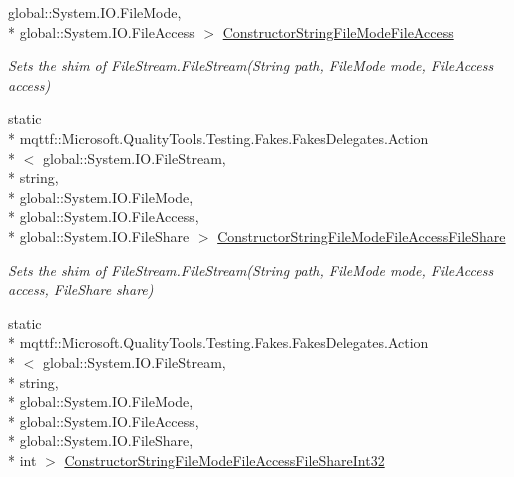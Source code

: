 \begin{DoxyCompactItemize}
global\-::\-System.\-I\-O.\-File\-Mode, \\*
global\-::\-System.\-I\-O.\-File\-Access $>$ \hyperlink{class_system_1_1_i_o_1_1_fakes_1_1_shim_file_stream_a887ebdd11f80824bc9edd71fa6af7ea5}{Constructor\-String\-File\-Mode\-File\-Access}
\begin{DoxyCompactList}\small\item\em Sets the shim of File\-Stream.\-File\-Stream(\-String path, File\-Mode mode, File\-Access access)\end{DoxyCompactList}\item 
static \\*
mqttf\-::\-Microsoft.\-Quality\-Tools.\-Testing.\-Fakes.\-Fakes\-Delegates.\-Action\\*
$<$ global\-::\-System.\-I\-O.\-File\-Stream, \\*
string, \\*
global\-::\-System.\-I\-O.\-File\-Mode, \\*
global\-::\-System.\-I\-O.\-File\-Access, \\*
global\-::\-System.\-I\-O.\-File\-Share $>$ \hyperlink{class_system_1_1_i_o_1_1_fakes_1_1_shim_file_stream_a7ddf87d61ad9926d3bb3f43d155b4c17}{Constructor\-String\-File\-Mode\-File\-Access\-File\-Share}
\begin{DoxyCompactList}\small\item\em Sets the shim of File\-Stream.\-File\-Stream(\-String path, File\-Mode mode, File\-Access access, File\-Share share)\end{DoxyCompactList}\item 
static \\*
mqttf\-::\-Microsoft.\-Quality\-Tools.\-Testing.\-Fakes.\-Fakes\-Delegates.\-Action\\*
$<$ global\-::\-System.\-I\-O.\-File\-Stream, \\*
string, \\*
global\-::\-System.\-I\-O.\-File\-Mode, \\*
global\-::\-System.\-I\-O.\-File\-Access, \\*
global\-::\-System.\-I\-O.\-File\-Share, \\*
int $>$ \hyperlink{class_system_1_1_i_o_1_1_fakes_1_1_shim_file_stream_a9357cffd31aad06496405ce0e87466e7}{Constructor\-String\-File\-Mode\-File\-Access\-File\-Share\-Int32}

\end{DoxyCompactItemize}
